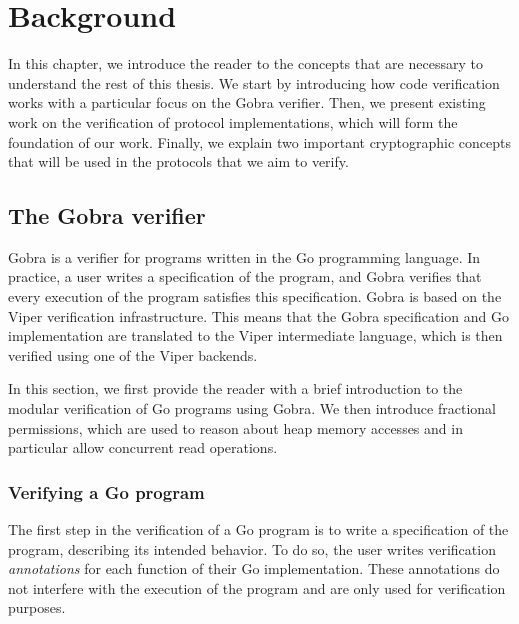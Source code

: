 \chapter{Background}
\label{chap:background}

In this chapter, we introduce the reader to the concepts that are necessary to understand the rest of this thesis.
We start by introducing how code verification works with a particular focus on the Gobra verifier.
Then, we present existing work on the verification of protocol implementations, which will form the foundation of our work.
Finally, we explain two important cryptographic concepts that will be used in the protocols that we aim to verify.

\section{The Gobra verifier}
\label{sec:the-gobra-verifier}

Gobra is a verifier for programs written in the Go programming language.
In practice, a user writes a specification of the program, and Gobra verifies that every execution of the program satisfies this specification.
Gobra is based on the Viper verification infrastructure. This means that the Gobra specification and Go implementation are translated to the Viper intermediate language, which is then verified using one of the Viper backends.

In this section, we first provide the reader with a brief introduction to the modular verification of Go programs using Gobra.
We then introduce fractional permissions, which are used to reason about heap memory accesses and in particular allow concurrent read operations.

\subsection{Verifying a Go program}
\label{sec:verifying-a-go-program}

The first step in the verification of a Go program is to write a specification of the program, describing its intended behavior.
To do so, the user writes verification \emph{annotations} for each function of their Go implementation.
These annotations do not interfere with the execution of the program and are only used for verification purposes.


